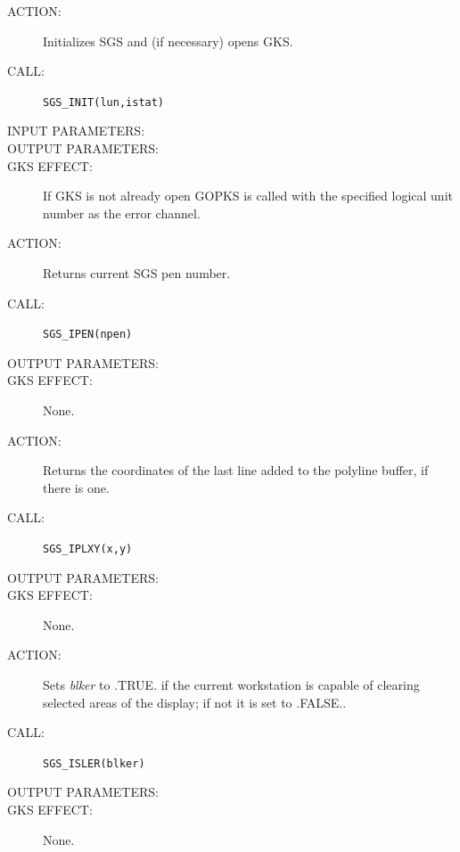 \documentclass[11pt]{article}
\begin{document}
\begin{description}
\item [ACTION:]
Initializes SGS and (if necessary) opens GKS.
\item [CALL:]
{\tt SGS\_INIT(lun,istat)}
\item [INPUT PARAMETERS:]
\begin{params}
\end{params}
\item [OUTPUT PARAMETERS:]
\begin{params}
\end{params}
\item [GKS EFFECT:]
If GKS is not already open GOPKS is called with the specified logical unit 
number as the error channel.
\end{description}
\goodbreak

\begin{description}
\item [ACTION:]
Returns current SGS pen number.
\item [CALL:]
{\tt SGS\_IPEN(npen)}
\item [OUTPUT PARAMETERS:]
\begin{params}
\end{params}
\item [GKS EFFECT:]
None.
\end{description}
\goodbreak

\begin{description}
\item [ACTION:]
Returns the coordinates of the last line added to the polyline buffer, if there
is one.
\item [CALL:]
{\tt SGS\_IPLXY(x,y)}
\item [OUTPUT PARAMETERS:]
\begin{params}
\end{params}
\item [GKS EFFECT:]
None.
\end{description}
\goodbreak

\begin{description}
\item [ACTION:]
Sets {\em blker}\/ to .TRUE. if the current workstation is capable of clearing
selected areas of the display; if not it is set to .FALSE..
\item [CALL:]
{\tt SGS\_ISLER(blker)}
\item [OUTPUT PARAMETERS:]
\begin{params}
\end{params}
\item [GKS EFFECT:]
None.
\end{description}
\goodbreak
\end{document}

